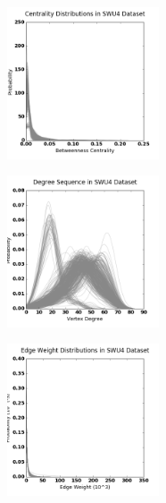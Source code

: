 \begin{figure}[h!]
\centering
\includegraphics[width=0.4\textwidth]{./stats/SWU4-centrality.png}
\end{figure}

\begin{figure}[h!]
\centering
\includegraphics[width=0.4\textwidth]{./stats/SWU4-degree.png}
\end{figure}

\begin{figure}[h!]
\centering
\includegraphics[width=0.4\textwidth]{./stats/SWU4-edgeweight.png}
\end{figure}
